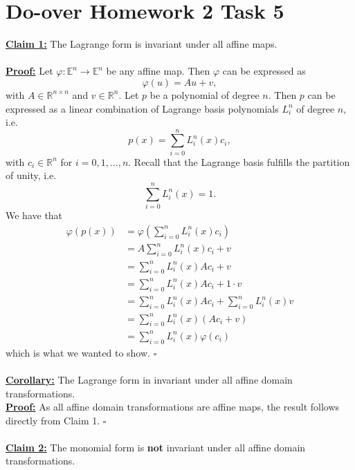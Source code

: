 \documentclass[]{article}
\begin{document}
\section*{Do-over Homework 2 Task 5}
\underline{\textbf{Claim 1:}} The Lagrange form is invariant under all affine maps.\\
\\
\underline{\textbf{Proof:}} Let $\varphi:\mathbb{E}^n\rightarrow\mathbb{E}^n$ be any affine map. Then $\varphi$ can be expressed as \begin{equation*}
\varphi(u) = Au + v,
\end{equation*}
with $A\in\mathbb{R}^{n\times n}$ and $v\in\mathbb{R}^n$. Let $p$ be a polynomial of degree $n$. Then $p$ can be expressed as a linear combination of Lagrange basis polynomials $L_i^n$ of degree $n$, i.e. \begin{equation*}
p(x) = \sum_{i = 0}^{n}L_i^n(x)c_i,
\end{equation*}
with $c_i\in\mathbb{R}^n$ for $i = 0, 1, \dots, n$. Recall that the Lagrange basis fulfills the partition of unity, i.e. \begin{equation*}
\sum_{i = 0}^{n}L_i^n(x)=1.
\end{equation*}
We have that \begin{equation*}
\begin{aligned}
\varphi(p(x)) &= \varphi\left(\sum_{i = 0}^{n}L_i^n(x)c_i\right)\\
&= A\sum_{i = 0}^{n}L_i^n(x)c_i + v\\
&= \sum_{i = 0}^{n}L_i^n(x)Ac_i + v\\
&= \sum_{i = 0}^{n}L_i^n(x)Ac_i + 1\cdot v\\
&= \sum_{i = 0}^{n}L_i^n(x)Ac_i + \sum_{i = 0}^{n}L_i^n(x)v\\
&= \sum_{i = 0}^{n}L_i^n(x)(Ac_i + v)\\
&= \sum_{i = 0}^{n}L_i^n(x)\varphi(c_i)
\end{aligned}
\end{equation*}
which is what we wanted to show. $\square$\\
\\
\underline{\textbf{Corollary:}} The Lagrange form in invariant under all affine domain transformations.\\
\underline{\textbf{Proof:}} As all affine domain transformations are affine maps, the result follows directly from Claim 1. $\square$\\
\\
\underline{\textbf{Claim 2:}} The monomial form is \textbf{not} invariant under all affine domain transformations.\\
\end{document}
